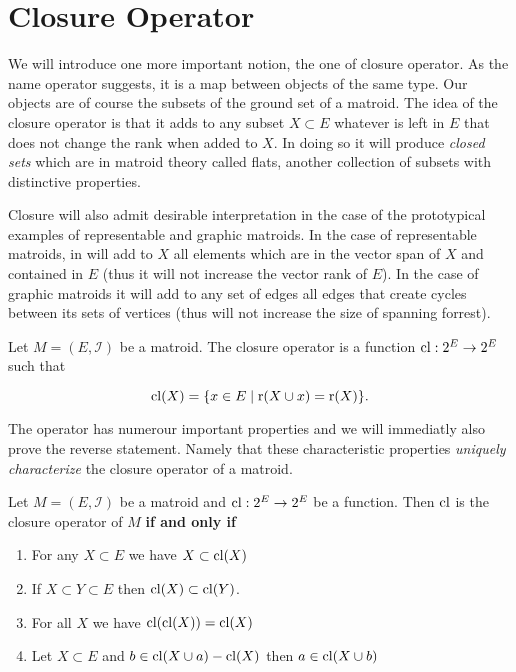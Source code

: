 \section{Closure Operator}


We will introduce one more important notion, the one of closure operator. As the name operator suggests, it is a map between objects of the same type. Our objects are of course the subsets of the ground set of a matroid. The idea of the closure operator is that it adds to any subset $X \subset E$ whatever is left in $E$ that does not change the rank when added to $X$. In doing so it will produce \textit{closed sets} which are in matroid theory called flats, another collection of subsets with distinctive properties. 

Closure will also admit desirable interpretation in the case of the prototypical examples of representable and graphic matroids. In the case of representable matroids, in will add to $X$ all elements which are in the vector span of $X$ and contained in $E$ (thus it will not increase the vector rank of $E$). In the case of graphic matroids it will add to any set of edges all edges that create cycles between its sets of vertices (thus will not increase the size of spanning forrest).

\begin{defn}
    Let $M = (E, \mathcal{I})$ be a matroid. The closure operator is a function $\mathrm{cl}: 2^E \to 2^E$ such that

    $$\mathrm{cl}(X) = \{x \in E\; | \; \text{r}(X \cup x) = \text{r}(X) \}.$$

    
\end{defn}

The operator has numerour important properties and we will immediatly also prove the reverse statement. Namely that these characteristic properties \textit{uniquely characterize} the closure operator of a matroid.

\begin{theorem}
Let $M = (E, \mathcal{I})$ be a matroid and $\mathrm{cl}: 2^E \to 2^E$ be a function. Then $\mathrm{cl}$ is the closure operator of $M$ \textbf{if and only if}

\begin{enumerate}
    \item For any $X \subset E$ we have $X \subset \mathrm{cl} (X)$
    \item If $X \subset Y \subset E$ then $\mathrm{cl}(X) \subset \mathrm{cl}(Y)$.
    \item For all $X$ we have $\mathrm{cl}(\mathrm{cl}(X)) = \mathrm{cl}(X)$

    \item Let $X \subset E$ and $b \in 
    \mathrm{cl}(X \cup a) - \mathrm{cl}(X)$ then $a \in \mathrm{cl}(X \cup b)$
\end{enumerate}
\end{theorem}


